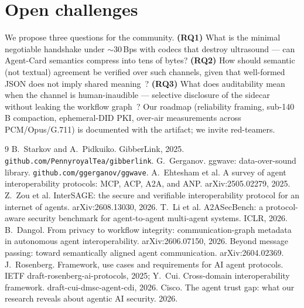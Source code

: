 \documentclass[10pt,twocolumn]{article}
\begin{document}
\section{Open challenges}
We propose three questions for the community.
\textbf{(RQ1)} What is the minimal negotiable handshake under $\sim$30\,Bps
with codecs that destroy ultrasound --- can Agent-Card semantics compress into
tens of bytes? \textbf{(RQ2)} How should semantic (not textual) agreement be
verified over such channels, given that well-formed JSON does not imply shared
meaning~\cite{semalign}? \textbf{(RQ3)} What does auditability mean when the
channel is human-inaudible --- selective disclosure of the sidecar without
leaking the workflow graph~\cite{graphmeta}? Our roadmap (reliability framing,
sub-140\,B compaction, ephemeral-DID PKI, over-air measurements across
PCM/Opus/G.711) is documented with the artifact; we invite red-teamers.

\begin{thebibliography}{9}
 B.~Starkov and A.~Pidkuiko. GibberLink, 2025. \texttt{github.com/PennyroyalTea/gibberlink}.
 G.~Gerganov. ggwave: data-over-sound library. \texttt{github.com/ggerganov/ggwave}.
 A.~Ehtesham et al. A survey of agent interoperability protocols: MCP, ACP, A2A, and ANP. arXiv:2505.02279, 2025.
 Z.~Zou et al. InterSAGE: the secure and verifiable interoperability protocol for an internet of agents. arXiv:2608.13030, 2026.
 T.~Li et al. A2ASecBench: a protocol-aware security benchmark for agent-to-agent multi-agent systems. ICLR, 2026.
 B.~Dangol. From privacy to workflow integrity: communication-graph metadata in autonomous agent interoperability. arXiv:2606.07150, 2026.
 Beyond message passing: toward semantically aligned agent communication. arXiv:2604.02369.
 J.~Rosenberg. Framework, use cases and requirements for AI agent protocols. IETF draft-rosenberg-ai-protocols, 2025; Y.~Cui. Cross-domain interoperability framework. draft-cui-dmsc-agent-cdi, 2026.
 Cisco. The agent trust gap: what our research reveals about agentic AI security. 2026.
\end{thebibliography}
\end{document}
